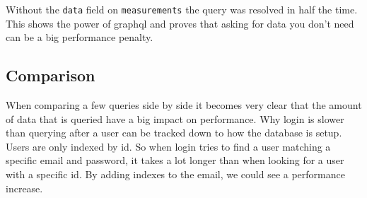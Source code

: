 Without the \verb+data+ field on \verb+measurements+ the query was resolved in half the
time. This shows the power of \gls{graphql} and proves that asking for data you
don't need can be a big performance penalty.


\newpage
\subsection{Comparison}
When comparing a few queries side by side it becomes very clear that the amount of data that
is queried have a big impact on performance. Why login is slower than querying after a user
can be tracked down to how the database is setup. Users are only indexed by id. So when login
tries to find a user matching a specific email and password, it takes a lot longer than when
looking for a user with a specific id. By adding indexes to the email, we could see a performance increase. 
